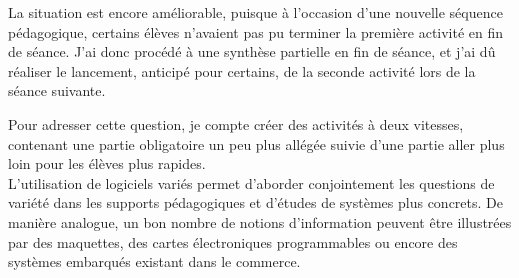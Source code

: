 \documentclass[pdftex,a4paper,12pt]{article}
\begin{document}
	La situation est encore améliorable, puisque à l'occasion d'une nouvelle séquence pédagogique, 
	certains élèves n'avaient pas pu terminer la première activité en fin de séance.
	J'ai donc procédé à une synthèse partielle en fin de séance, et j'ai dû réaliser le lancement, anticipé pour certains, 
	de la seconde activité lors de la séance suivante.

	Pour adresser cette question, je compte créer des activités \og{}à deux vitesses\fg{}, contenant une partie obligatoire un peu plus allégée 
	suivie d'une partie \og{}aller plus loin\fg{} pour les élèves plus rapides.\\

	L'utilisation de logiciels variés permet d'aborder conjointement les questions de variété dans les supports pédagogiques et d'études de systèmes plus concrets.
	De manière analogue, un bon nombre de notions d'information peuvent être illustrées par des maquettes, des cartes électroniques programmables 
	ou encore des systèmes embarqués existant dans le commerce.
	
\end{document}
